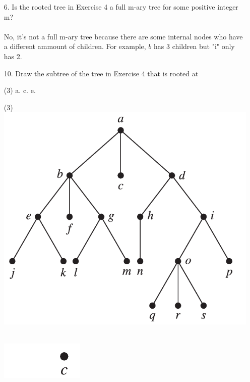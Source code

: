 \begin{itemize}
    \item[6.]  Is the rooted tree in Exercise 4 a full m-ary tree for some
          positive integer m? \\
          \answer \\
          No, it's not a full m-ary tree because there are some internal nodes who
          have a different ammount of children. For example, $b$ has 3 children but "i"
          only has 2.

    \item[10.]  Draw the subtree of the tree in Exercise 4 that is rooted
          at
          \begin{tasks}(3)
              \task a.
              \task c.
              \task e.
          \end{tasks}
          \answer
          \begin{tasks}(3)
              \task \text{}\\
              \includegraphics[scale = 0.35]{img/11_1_4_graph.png}

              \task \text{}\\
              \includegraphics[scale = 0.5]{img/11_1_10b_graph.png}


\end{tasks}
\end{itemize}
